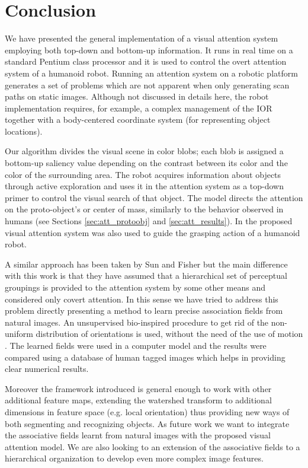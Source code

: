 \documentclass{llncs}
\begin{document}
\section{Conclusion}
\label{sec:conclusion}
We have presented the general implementation of a visual
attention system employing both top-down and
bottom-up information. It runs in real time on a
standard Pentium class processor and it is used to
control the overt attention system of a humanoid
robot. Running an attention system on a robotic platform
generates a set of problems which are not apparent when
only generating scan paths on static images. Although not
discussed in details here, the robot implementation
requires, for example, a complex management of the IOR
together with a body-centered coordinate system (for representing 
object locations).

Our algorithm divides the visual scene in color
blobs; each blob is assigned a bottom-up saliency value
depending on the contrast between its color and the
color of the surrounding area. The robot acquires
information about objects through active exploration
and uses it in the attention system as a top-down
primer to control the visual search of that object. The
model directs the attention on the proto-object's or
center of mass, similarly to the behavior observed in
humans (see Sections \ref{sec:att_protoobj} and
\ref{sec:att_results}).
In \cite{NataleOBMS05,Orabona07} the proposed visual attention system was also used to
guide the grasping action of a humanoid robot.

A similar approach has been taken by Sun and
Fisher \cite{SunF03} but the main difference with this work is that
they have assumed that a hierarchical set of perceptual
groupings is provided to the attention system by some
other means and considered only covert attention.
In this sense we have tried to address this problem directly presenting a method to learn
precise association fields from natural images. An unsupervised bio-inspired procedure
to get rid of the non-uniform distribution of orientations
is used, without the need of the use of motion \cite{Prodohl01}.
The learned fields were used in a computer model
and the results were compared using a database of human tagged images which helps
in providing clear numerical results.

Moreover the framework introduced is general enough
to work with other additional feature maps, extending the
watershed transform to additional dimensions in feature
space (e.g. local orientation) thus providing new ways
of both segmenting and recognizing objects.
As future work we want to integrate the associative fields
learnt from natural images with the proposed visual attention
model. We are also looking to an extension of the associative
fields to a hierarchical organization to develop even more
complex image features.



\end{document}
